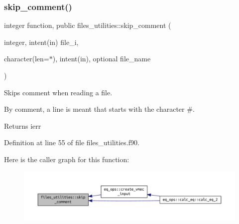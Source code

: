 \subsubsection{\texorpdfstring{skip\+\_\+comment()}{skip\_comment()}}
{\footnotesize\ttfamily integer function, public files\+\_\+utilities\+::skip\+\_\+comment (\begin{DoxyParamCaption}\item[{integer, intent(in)}]{file\+\_\+i,  }\item[{character(len=$\ast$), intent(in), optional}]{file\+\_\+name }\end{DoxyParamCaption})}



Skips comment when reading a file. 

By comment, a line is meant that starts with the character {\ttfamily \#}.

\begin{DoxyReturn}{Returns}
ierr 
\end{DoxyReturn}


Definition at line 55 of file files\+\_\+utilities.\+f90.

Here is the caller graph for this function\+:
\nopagebreak
\begin{figure}[H]
\begin{center}
\leavevmode
\includegraphics[width=350pt]{namespacefiles__utilities_ac5befac3b753b28003e6878bec2af381_icgraph}
\end{center}
\end{figure}
